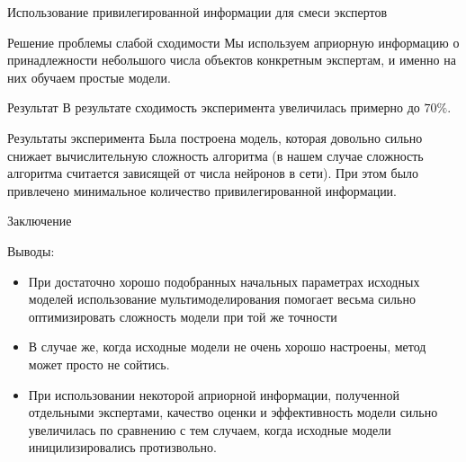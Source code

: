 \documentclass{beamer}
\begin{document}
\begin{frame}{Использование привилегированной информации для смеси экспертов}
\begin{block}{Решение проблемы слабой сходимости}
Мы используем априорную информацию о принадлежности небольшого числа объектов конкретным экспертам, и именно на них 
обучаем простые модели. 

\begin{figure}[!htb]
\end{figure}

\end{block}

\begin{block}{Результат}
В результате сходимость эксперимента увеличилась примерно до $70 \%$. 
\end{block}

\end{frame}


\begin{frame}{Результаты эксперимента}
Была построена модель, которая довольно сильно снижает вычислительную сложность алгоритма (в нашем случае сложность алгоритма считается зависящей от числа нейронов в сети). При этом было привлечено минимальное количество привилегированной информации. 
\end{frame}


\begin{frame}{Заключение}
\begin{block}{Выводы:}
\begin{itemize}
  \item При достаточно хорошо подобранных начальных параметрах исходных моделей использование мультимоделирования помогает весьма сильно оптимизировать сложность модели при той же точности

  \item В случае же, когда исходные модели не очень хорошо настроены, метод может просто не сойтись.

\item При использовании некоторой априорной  информации, полученной отдельными экспертами,  качество оценки и эффективность модели сильно увеличилась по сравнению с тем случаем, когда исходные модели иницилизировались протизвольно.

\end{itemize}
\end{block}
\end{frame}
\end{document}
